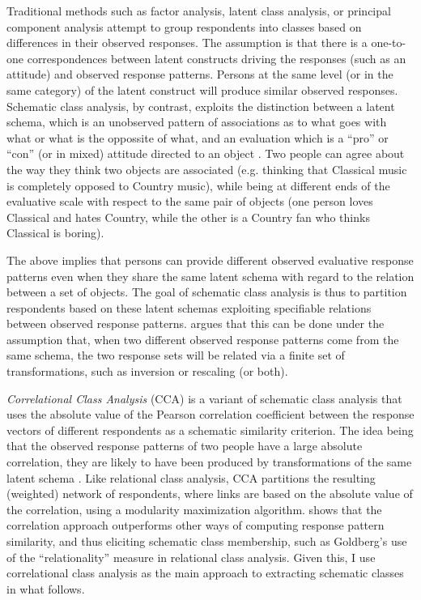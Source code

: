 \documentclass[preprint, authoryear,11pt, 3p]{elsarticle}
\begin{document}
Traditional methods such as factor analysis, latent class analysis, or principal component analysis attempt to group respondents into classes based on differences in their observed responses. The assumption is that there is a one-to-one correspondences between latent constructs driving the responses (such as an attitude) and observed response patterns. Persons at the same level (or in the same category) of the latent construct will produce similar observed responses. Schematic class analysis, by contrast, exploits the distinction between a latent schema, which is an unobserved pattern of associations as to what goes with what or what is the oppossite of what, and an evaluation which is a ``pro'' or ``con'' (or in mixed) attitude directed to an object \citep{goldberg2018beyond}. Two people can agree about the way they think two objects are associated (e.g. thinking that Classical music is completely opposed to Country music), while being at different ends of the evaluative scale with respect to the same pair of objects (one person loves Classical and hates Country, while the other is a Country fan who thinks Classical is boring). 

The above implies that persons can provide different observed evaluative response patterns even when they share the same latent schema with regard to the relation between a set of objects. The goal of schematic class analysis is thus to partition respondents based on these latent schemas exploiting specifiable relations between observed response patterns. \citet{boutyline2017improving} argues that this can be done under the assumption that, when two different observed response patterns come from the same schema, the two response sets will be related via a finite set of transformations, such as inversion or rescaling (or both).

{\em Correlational Class Analysis} (CCA) is a variant of schematic class analysis that uses the absolute value of the Pearson correlation coefficient between the response vectors of different respondents as a schematic similarity criterion. The idea being that the observed response patterns of two people have a large absolute correlation, they are likely to have been produced by transformations of the same latent schema \citep{boutyline2017improving}. Like relational class analysis, CCA partitions the resulting (weighted) network of respondents, where links are based on the absolute value of the correlation, using a modularity maximization algorithm. \citet{boutyline2017improving} shows that the correlation approach outperforms other ways of computing response pattern similarity, and thus eliciting schematic class membership, such as Goldberg's \citeyear{goldberg2011mapping} use of the ``relationality'' measure in relational class analysis. Given this, I use correlational class analysis as the main approach to extracting schematic classes in what follows.  
\end{document}
